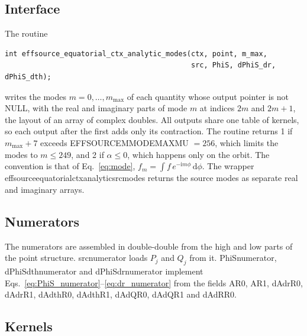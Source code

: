 \documentclass[11pt]{article}
\newcommand{\ii}{\mathrm{i}}
\newcommand{\dd}{\mathrm{d}}
\newcommand{\codeus}{\textunderscore\allowbreak}
\newcommand{\codehy}{-\allowbreak}
\newcommand{\code}[1]{{\ttfamily\let\_\codeus\let\-\codehy #1}}
\begin{document}
\subsection{Interface}

The routine
\begin{verbatim}
int effsource_equatorial_ctx_analytic_modes(ctx, point, m_max,
                                            src, PhiS, dPhiS_dr, dPhiS_dth);
\end{verbatim}
writes the modes $m=0,\dots,m_{\max}$ of each quantity whose output pointer is
not \code{NULL}, with the real and imaginary parts of mode $m$ at indices $2m$
and $2m+1$, the layout of an array of complex doubles. All outputs share one
table of kernels, so each output after the first adds only its contraction.
The routine returns 1 if $m_{\max}+7$ exceeds
\code{EFFSOURCE\_MMODE\_MAX\_MU} $=256$, which limits the modes to
$m\le249$, and 2 if $\alpha\le0$, which happens only on the orbit. The
convention is that of Eq.~\eqref{eq:mode}, $f_m=\int f\,e^{-\ii m\phi}\,\dd\phi$.
The wrapper \code{effsource\_equatorial\_ctx\_analytic\_src\_modes} returns the
source modes as separate real and imaginary arrays.

\subsection{Numerators}

The numerators are assembled in double-double from the high and low parts of
the point structure. \code{src\_numerator} loads $P_j$ and $Q_j$ from it.
\code{PhiS\_numerator}, \code{dPhiS\_dth\_numerator} and
\code{dPhiS\_dr\_numerator} implement
Eqs.~\eqref{eq:PhiS_numerator}--\eqref{eq:dr_numerator} from the fields
\code{A\_R0}, \code{A\_R1}, \code{dA\_dr\_R0}, \code{dA\_dr\_R1},
\code{dA\_dth\_R0}, \code{dA\_dth\_R1}, \code{dA\_dQ\_R0}, \code{dA\_dQ\_R1} and
\code{dA\_dR\_R0}.

\subsection{Kernels}
\end{document}
